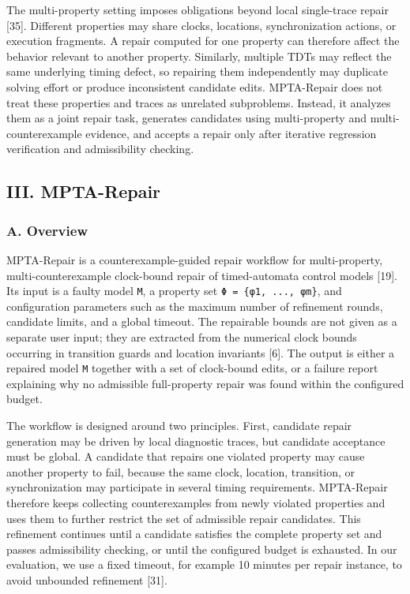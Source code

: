 \documentclass[
]{article}
\begin{document}
The multi-property setting imposes obligations beyond local single-trace
repair {[}35{]}. Different properties may share clocks, locations,
synchronization actions, or execution fragments. A repair computed for
one property can therefore affect the behavior relevant to another
property. Similarly, multiple TDTs may reflect the same underlying
timing defect, so repairing them independently may duplicate solving
effort or produce inconsistent candidate edits. MPTA-Repair does not
treat these properties and traces as unrelated subproblems. Instead, it
analyzes them as a joint repair task, generates candidates using
multi-property and multi-counterexample evidence, and accepts a repair
only after iterative regression verification and admissibility checking.

\subsection{III. MPTA-Repair}\label{iii.-mpta-repair}

\subsubsection{A. Overview}\label{a.-overview}

MPTA-Repair is a counterexample-guided repair workflow for
multi-property, multi-counterexample clock-bound repair of
timed-automata control models {[}19{]}. Its input is a faulty model
\texttt{M}, a property set \texttt{Φ\ =\ \{φ1,\ ...,\ φm\}}, and
configuration parameters such as the maximum number of refinement
rounds, candidate limits, and a global timeout. The repairable bounds
are not given as a separate user input; they are extracted from the
numerical clock bounds occurring in transition guards and location
invariants {[}6{]}. The output is either a repaired model
\texttt{M\textquotesingle{}} together with a set of clock-bound edits,
or a failure report explaining why no admissible full-property repair
was found within the configured budget.

The workflow is designed around two principles. First, candidate repair
generation may be driven by local diagnostic traces, but candidate
acceptance must be global. A candidate that repairs one violated
property may cause another property to fail, because the same clock,
location, transition, or synchronization may participate in several
timing requirements. MPTA-Repair therefore keeps collecting
counterexamples from newly violated properties and uses them to further
restrict the set of admissible repair candidates. This refinement
continues until a candidate satisfies the complete property set and
passes admissibility checking, or until the configured budget is
exhausted. In our evaluation, we use a fixed timeout, for example 10
minutes per repair instance, to avoid unbounded refinement {[}31{]}.
\end{document}
